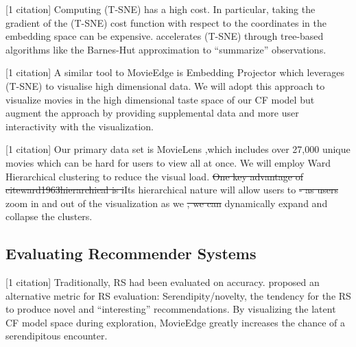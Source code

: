 [1 citation] Computing \mbox{(T-SNE)} has a high cost. In particular, taking the gradient of the \mbox{(T-SNE)} cost function with respect to the coordinates in the embedding space can be expensive.  \cite{van2014accelerating} accelerates \mbox{(T-SNE)} through tree-based algorithms like the Barnes-Hut approximation to “summarize” observations.  

[1 citation] A similar tool to MovieEdge is Embedding Projector \cite{smilkov2016embedding} which leverages \mbox{(T-SNE)} to visualise high dimensional data. We will adopt this approach to visualize movies in the high dimensional taste space of our CF model but augment the approach by providing supplemental data and more user interactivity with the visualization. 

[1 citation] Our primary data set is MovieLens \cite{harper2016movielens},which includes over 27,000 unique movies which can be hard for users to view all at once. We will employ Ward Hierarchical clustering \cite{ward1963hierarchical} to reduce the visual load. \st{One key advantage of cite{ward1963hierarchical} is i}Its hierarchical nature will allow users to \st{- as users} zoom in and out of the visualization as we \st{, we can} dynamically expand and collapse the clusters.

\subsection{Evaluating Recommender Systems}

[1 citation] Traditionally, RS had been evaluated on accuracy. \cite{herlocker2004evaluating} proposed an alternative metric for RS evaluation: Serendipity/novelty, the tendency for the RS to produce novel and “interesting” recommendations. By visualizing the latent CF model space during exploration, MovieEdge greatly increases the chance of a serendipitous encounter.


